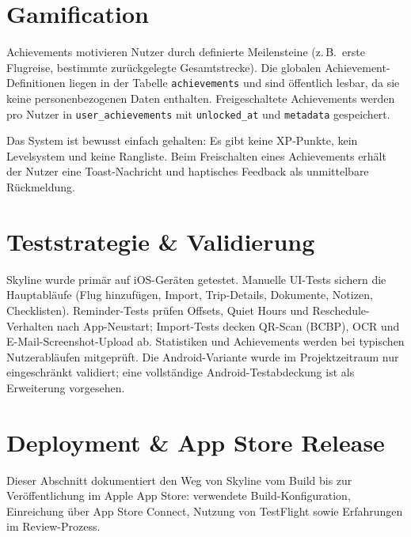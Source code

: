 \section{Gamification}

Achievements motivieren Nutzer durch definierte Meilensteine (z.\,B.\ erste Flugreise,
bestimmte zurückgelegte Gesamtstrecke). Die globalen Achievement-Definitionen liegen
in der Tabelle \texttt{achievements} und sind öffentlich lesbar, da sie keine
personenbezogenen Daten enthalten. Freigeschaltete Achievements werden pro Nutzer in
\texttt{user\_achievements} mit \texttt{unlocked\_at} und \texttt{metadata} gespeichert.

Das System ist bewusst einfach gehalten: Es gibt keine XP-Punkte, kein Levelsystem
und keine Rangliste. Beim Freischalten eines Achievements erhält der Nutzer eine
Toast-Nachricht und haptisches Feedback als unmittelbare Rückmeldung.

\section{Teststrategie \& Validierung}

Skyline wurde primär auf iOS-Geräten getestet. Manuelle UI-Tests sichern die
Hauptabläufe (Flug hinzufügen, Import, Trip-Details, Dokumente, Notizen,
Checklisten). Reminder-Tests prüfen Offsets, Quiet Hours und Reschedule-Verhalten
nach App-Neustart; Import-Tests decken QR-Scan (BCBP), OCR und
E-Mail-Screenshot-Upload ab. Statistiken und Achievements werden bei typischen
Nutzerabläufen mitgeprüft. Die Android-Variante wurde im Projektzeitraum nur
eingeschränkt validiert; eine vollständige Android-Testabdeckung ist als
Erweiterung vorgesehen.

\section{Deployment \& App Store Release}\label{sec:deployment-appstore}

Dieser Abschnitt dokumentiert den Weg von Skyline vom Build bis zur Veröffentlichung
im Apple App Store: verwendete Build-Konfiguration, Einreichung über App Store Connect,
Nutzung von TestFlight sowie Erfahrungen im Review-Prozess.

